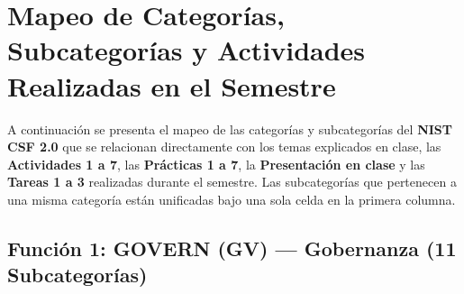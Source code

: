 \documentclass[letterpaper,11pt]{article}
\begin{document}
\section{Mapeo de Categorías, Subcategorías y Actividades Realizadas en el Semestre}

A continuación se presenta el mapeo de las categorías y subcategorías del \textbf{NIST CSF 2.0} que se relacionan directamente con los temas explicados en clase, las \textbf{Actividades 1 a 7}, las \textbf{Prácticas 1 a 7}, la \textbf{Presentación en clase} y las \textbf{Tareas 1 a 3} realizadas durante el semestre. Las subcategorías que pertenecen a una misma categoría están unificadas bajo una sola celda en la primera columna.

\subsection{Función 1: GOVERN (GV) --- Gobernanza (11 Subcategorías)}
\end{document}
